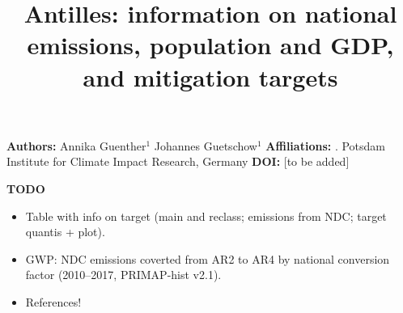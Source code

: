 \documentclass[12pt]{article}
\title{ \bfseries \color{PIKorange} Antilles: information on national emissions, population and GDP, and mitigation targets}
\begin{document}
 \maketitle

 \noindent \textbf{Authors:} \newline
 \indent Annika Guenther$^{1}$ \newline
 \indent Johannes Guetschow$^{1}$ \newline
 \noindent \textbf{Affiliations:} \newline
 . Potsdam Institute for Climate Impact Research, Germany \newline
 \noindent \textbf{DOI:} [to be added] \newline

 \textbf{TODO}
 \begin{itemize}
 \item Table with info on target (main and reclass; emissions from NDC; target quantis + plot).
 \item GWP: NDC emissions coverted from AR2 to AR4 by national conversion factor (2010--2017, PRIMAP-hist v2.1).
 \item References!
 \end{itemize}

\end{document}
